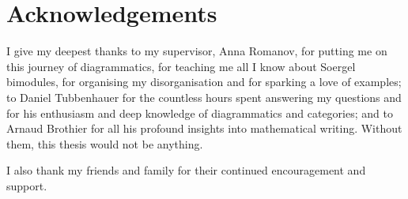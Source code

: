 \chapter*{Acknowledgements}
\thispagestyle{empty}

I give my deepest thanks to my supervisor, Anna Romanov, for putting me on this journey of diagrammatics, for teaching me all I know about Soergel bimodules, for organising my disorganisation and for sparking a love of examples; to Daniel Tubbenhauer for the countless hours spent answering my questions and for his enthusiasm and deep knowledge of diagrammatics and categories; and to Arnaud Brothier for all his profound insights into mathematical writing. Without them, this thesis would not be anything.

I also thank my friends and family for their continued encouragement and support.

